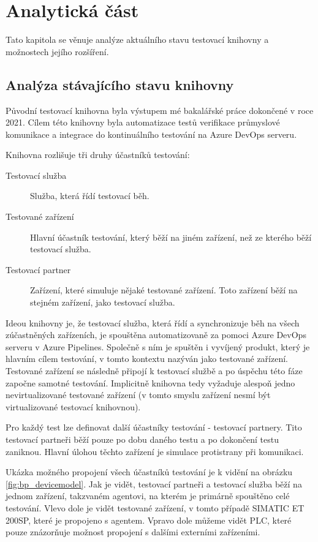 \chapter{Analytická část}\label{chap:anal}

Tato kapitola se věnuje analýze aktuálního stavu testovací knihovny a možnostech jejího rozšíření.

\section{Analýza stávajícího stavu knihovny}

Původní testovací knihovna byla výstupem mé bakalářské práce\cite{bakalarka} dokončené v roce 2021. Cílem této knihovny byla automatizace testů verifikace průmyslové komunikace a integrace do kontinuálního testování na Azure DevOps serveru. 

Knihovna rozlišuje tři druhy účastníků testování:

\begin{description}
    \item[Testovací služba] Služba, která řídí testovací běh.
    \item[Testované zařízení] Hlavní účastník testování, který běží na jiném zařízení, než ze kterého běží testovací služba. 
    \item[Testovací partner] Zařízení, které simuluje nějaké testované zařízení. Toto zařízení běží na stejném zařízení, jako testovací služba. 
\end{description}

Ideou knihovny je, že testovací služba, která řídí a synchronizuje běh na všech zúčastněných zařízeních, je spouštěna automatizovaně za pomoci Azure DevOps serveru v Azure Pipelines. Společně s ním je spuštěn i vyvíjený produkt, který je hlavním cílem testování, v tomto kontextu nazýván jako testované zařízení. Testované zařízení se následně připojí k testovací službě a po úspěchu této fáze započne samotné testování. Implicitně knihovna tedy vyžaduje alespoň jedno nevirtualizované testované zařízení (v tomto smyslu zařízení nesmí být virtualizované testovací knihovnou). 

Pro každý test lze definovat další účastníky testování - testovací partnery. Tito testovací partneři běží pouze po dobu daného testu a po dokončení testu zaniknou. Hlavní úlohou těchto zařízení je simulace protistrany při komunikaci. 

Ukázka možného propojení všech účastníků testování je k vidění na obrázku \ref{fig:bp_devicemodel}. Jak je vidět, testovací partneři a testovací služba běží na jednom zařízení, takzvaném agentovi, na kterém je primárně spouštěno celé testování. Vlevo dole je vidět testované zařízení, v tomto případě SIMATIC ET 200SP, které je propojeno s agentem. Vpravo dole můžeme vidět PLC, které pouze znázorňuje možnost propojení s dalšími externími zařízeními.

